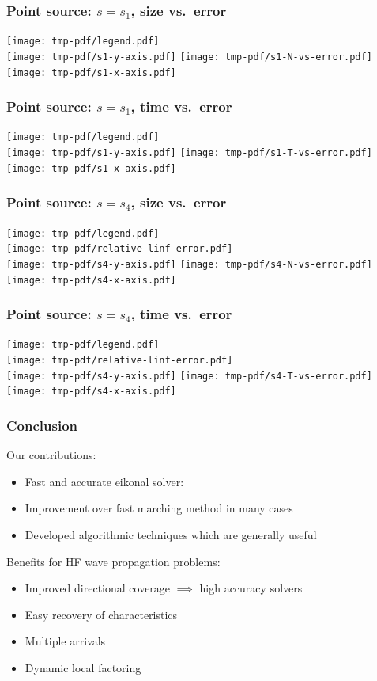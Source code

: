 \documentclass{beamer}
\begin{document}
\begin{frame}
  \frametitle{Point source: $s = s_1$, size vs.\ error}
  \centering
  \texttt{[image: tmp-pdf/legend.pdf]} \\
  \texttt{[image: tmp-pdf/s1-y-axis.pdf]}
  \texttt{[image: tmp-pdf/s1-N-vs-error.pdf]} \\
  \texttt{[image: tmp-pdf/s1-x-axis.pdf]}
\end{frame}

\begin{frame}
  \frametitle{Point source: $s = s_1$, time vs.\ error}
  \centering
  \texttt{[image: tmp-pdf/legend.pdf]} \\
  \texttt{[image: tmp-pdf/s1-y-axis.pdf]}
  \texttt{[image: tmp-pdf/s1-T-vs-error.pdf]} \\
  \hspace{1em}\texttt{[image: tmp-pdf/s1-x-axis.pdf]}
\end{frame}

\begin{frame}
  \frametitle{Point source: $s = s_4$, size vs.\ error}
  \centering
  \texttt{[image: tmp-pdf/legend.pdf]} \\
  \texttt{[image: tmp-pdf/relative-linf-error.pdf]} \\
  \vspace{-1.5em}
  \texttt{[image: tmp-pdf/s4-y-axis.pdf]}
  \texttt{[image: tmp-pdf/s4-N-vs-error.pdf]} \\
  \texttt{[image: tmp-pdf/s4-x-axis.pdf]}
\end{frame}

\begin{frame}
  \frametitle{Point source: $s = s_4$, time vs.\ error}
  \centering
  \texttt{[image: tmp-pdf/legend.pdf]} \\
  \texttt{[image: tmp-pdf/relative-linf-error.pdf]} \\
  \vspace{-1.5em}
  \texttt{[image: tmp-pdf/s4-y-axis.pdf]}
  \texttt{[image: tmp-pdf/s4-T-vs-error.pdf]} \\
  \hspace{1.1em}\texttt{[image: tmp-pdf/s4-x-axis.pdf]}
\end{frame}

\begin{frame}
  \frametitle{Conclusion}
  Our contributions:\pause
  \begin{itemize}
  \item Fast and accurate eikonal solver\pause:
  \item Improvement over fast marching method in many cases \pause
  \item Developed algorithmic techniques which are generally useful \pause
  \end{itemize}
  Benefits for HF wave propagation problems\pause:
  \begin{itemize}
  \item Improved directional coverage $\implies$ high accuracy solvers \pause
  \item Easy recovery of characteristics \pause
  \item Multiple arrivals \pause
  \item Dynamic local factoring
  \end{itemize}
\end{frame}
\end{document}
